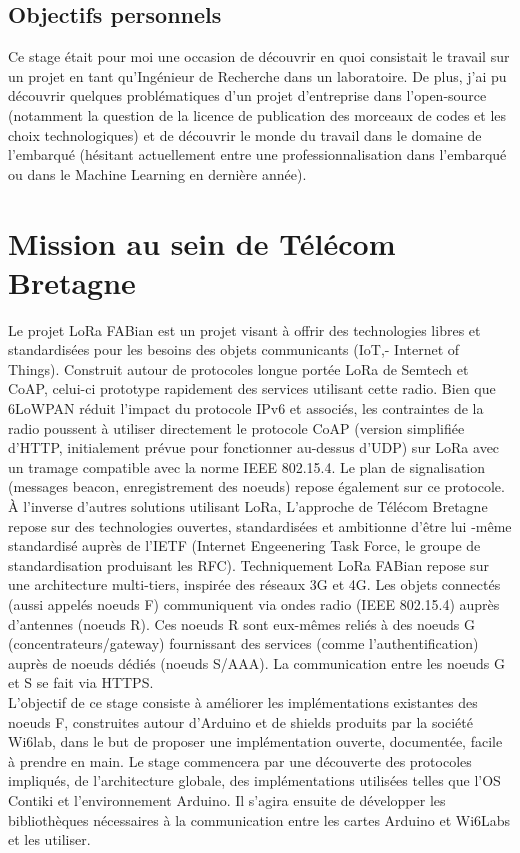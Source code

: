 \documentclass{article}
\begin{document}
\subsection{Objectifs personnels}
Ce stage était pour moi une occasion de découvrir en quoi consistait le travail sur un projet en tant qu'Ingénieur de Recherche dans un laboratoire. De plus, j'ai pu découvrir quelques problématiques d'un projet d'entreprise dans l'open-source (notamment la question de la licence de publication des morceaux de codes et les choix technologiques) et de découvrir le monde du travail dans le domaine de l'embarqué (hésitant actuellement entre une professionnalisation dans l'embarqué ou dans le Machine Learning en dernière année).

\section{Mission au sein de Télécom Bretagne}
Le projet LoRa FABian est un projet visant à offrir des technologies libres et standardisées pour les besoins des objets communicants (IoT,- Internet of Things). Construit autour de protocoles longue portée LoRa de Semtech et CoAP, celui-ci prototype rapidement des services utilisant cette radio. Bien que 6LoWPAN réduit l’impact du protocole IPv6 et associés, les contraintes de la radio poussent à utiliser directement le protocole CoAP (version simplifiée d'HTTP, initialement prévue pour fonctionner au-dessus d'UDP) sur LoRa avec un tramage compatible avec la norme IEEE 802.15.4. Le plan de signalisation (messages beacon, enregistrement des noeuds) repose également sur ce protocole. À l'inverse d’autres solutions utilisant LoRa, L’approche de Télécom Bretagne repose sur des technologies ouvertes, standardisées et ambitionne d'être lui -même standardisé auprès de l'IETF (Internet Engeenering Task Force, le groupe de standardisation produisant les RFC). Techniquement LoRa FABian repose sur une architecture multi-tiers, inspirée des réseaux 3G et 4G. Les objets connectés (aussi appelés noeuds F) communiquent via ondes radio (IEEE 802.15.4) auprès d'antennes (noeuds R). Ces noeuds R sont eux-mêmes reliés à des noeuds G (concentrateurs/gateway) fournissant des services (comme l'authentification) auprès de noeuds dédiés (noeuds S/AAA). La communication entre les noeuds G et S se fait via HTTPS.\\

L'objectif de ce stage consiste à améliorer les implémentations existantes des noeuds F, construites autour d'Arduino et de shields produits par la société Wi6lab, dans le but de proposer une implémentation ouverte, documentée, facile à prendre en main. Le stage commencera par une découverte des protocoles impliqués, de l'architecture globale, des implémentations utilisées telles que l'OS Contiki et l'environnement Arduino. Il s’agira ensuite de développer les bibliothèques nécessaires à la communication entre les cartes Arduino et Wi6Labs et les utiliser.\\
\end{document}
